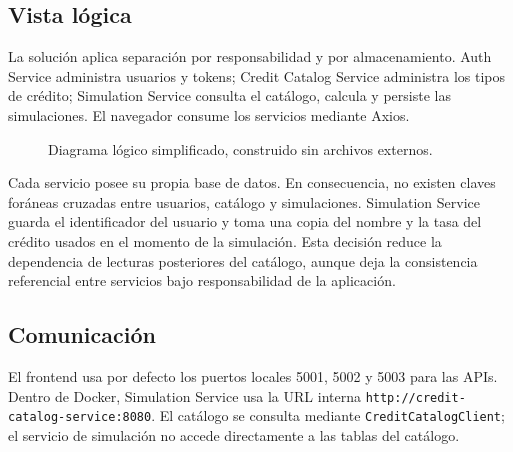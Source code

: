 \documentclass[12pt,a4paper]{article}
\begin{document}
\subsection{Vista lógica}

La solución aplica separación por responsabilidad y por almacenamiento. Auth
Service administra usuarios y tokens; Credit Catalog Service administra los
tipos de crédito; Simulation Service consulta el catálogo, calcula y persiste
las simulaciones. El navegador consume los servicios mediante Axios.

\begin{figure}[H]
\centering
{}
\caption{Diagrama lógico simplificado, construido sin archivos externos.}
\label{fig:arquitectura}
\end{figure}

Cada servicio posee su propia base de datos. En consecuencia, no existen
claves foráneas cruzadas entre usuarios, catálogo y simulaciones. Simulation
Service guarda el identificador del usuario y toma una copia del nombre y la
tasa del crédito usados en el momento de la simulación. Esta decisión reduce
la dependencia de lecturas posteriores del catálogo, aunque deja la
consistencia referencial entre servicios bajo responsabilidad de la
aplicación.

\subsection{Comunicación}

El frontend usa por defecto los puertos locales 5001, 5002 y 5003 para las
APIs. Dentro de Docker, Simulation Service usa la URL interna
\texttt{http://credit-catalog-service:8080}. El catálogo se consulta mediante
\texttt{CreditCatalogClient}; el servicio de simulación no accede directamente
a las tablas del catálogo.
\end{document}
